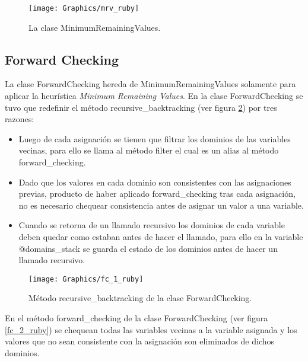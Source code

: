 \begin{figure}[h]
	\begin{center}
		\texttt{[image: Graphics/mrv\_ruby]}
		\caption{La clase \textsf{MinimumRemainingValues}.}
		\label{mrv_ruby}
	\end{center}	
\end{figure}

\subsection{Forward Checking}

La clase \textsf{ForwardChecking} hereda de \textsf{MinimumRemainingValues} solamente para aplicar la heur\'istica \emph{Minimum Remaining Values}. En la clase \textsf{ForwardChecking} se tuvo que redefinir el m\'etodo \textsf{recursive\_backtracking} (ver figura \ref{fc_1_ruby}) por tres razones:

\begin{itemize}

\item Luego de cada asignaci\'on se tienen que filtrar los dominios de las variables vecinas, para ello se llama al m\'etodo \textsf{filter} el cual es un alias al m\'etodo \textsf{forward\_checking}.
\item Dado que los valores en cada dominio son consistentes con las asignaciones previas, producto de haber aplicado \textsf{forward\_checking} tras cada asignaci\'on, no es necesario chequear consistencia antes de asignar un valor a una variable.
\item Cuando se retorna de un llamado recursivo los dominios de cada variable deben quedar como estaban antes de hacer el llamado, para ello en la variable \textsf{@domains\_stack} se guarda el estado de los dominios antes de hacer un llamado recursivo.

\end{itemize}

\begin{figure}[h]
	\begin{center}
		\texttt{[image: Graphics/fc\_1\_ruby]}
		\caption{M\'etodo \textsf{recursive\_backtracking} de la clase \textsf{ForwardChecking}.}
		\label{fc_1_ruby}
	\end{center}	
\end{figure}

En el m\'etodo \textsf{forward\_checking} de la clase \textsf{ForwardChecking} (ver figura \ref{fc_2_ruby}) se chequean todas las variables vecinas a la variable asignada y los valores que no sean consistente con la asignaci\'on son eliminados de dichos dominios.

